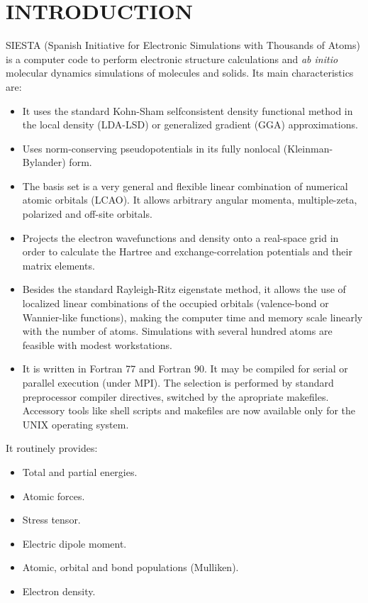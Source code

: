 
\tableofcontents

\newpage



\section{INTRODUCTION}

SIESTA (Spanish Initiative for Electronic Simulations with
Thousands of Atoms) is a computer code to perform electronic
structure calculations and {\it ab initio} molecular dynamics
simulations of molecules and solids.
Its main characteristics are:
\begin{itemize}
\item
It uses the standard Kohn-Sham selfconsistent density functional
method in the local density (LDA-LSD) or generalized gradient (GGA)
approximations.
\item
Uses norm-conserving pseudopotentials in its fully nonlocal
(Kleinman-Bylander) form.
\item
The basis set is a very general and flexible linear combination of 
numerical atomic orbitals (LCAO). It allows arbitrary angular
momenta, multiple-zeta, polarized and off-site orbitals.
\item
Projects the electron wavefunctions and density onto a real-space
grid in order to calculate the Hartree and exchange-correlation
potentials and their matrix elements.
\item
Besides the standard Rayleigh-Ritz eigenstate method, it allows
the use of localized linear combinations of the occupied orbitals
(valence-bond or Wannier-like functions), making the computer
time and memory scale linearly with the number of atoms.
Simulations with several hundred atoms are feasible with
modest workstations.
\item
It is written in Fortran 77 and Fortran 90.
It may be compiled for serial or parallel execution (under MPI).
The selection is performed by standard preprocessor compiler
directives, switched by the apropriate makefiles.
Accessory tools like shell scripts and makefiles are now
available only for the UNIX operating system.
\end{itemize}

It routinely provides:
\begin{itemize}
\item Total and partial energies.
\item Atomic forces.
\item Stress tensor.
\item Electric dipole moment.
\item Atomic, orbital and bond populations (Mulliken).
\item Electron density.
\end{itemize}

